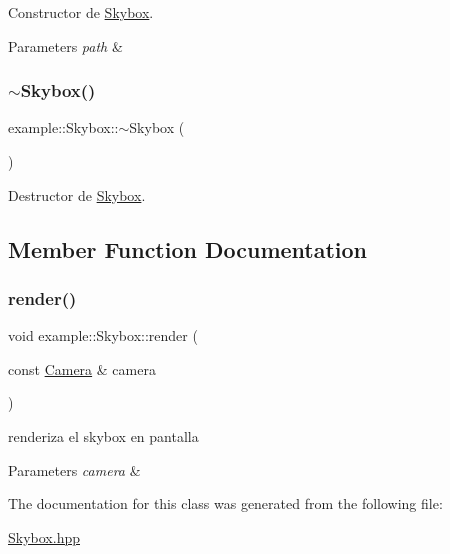 Constructor de \mbox{\hyperlink{classexample_1_1_skybox}{Skybox}}. 


\begin{DoxyParams}{Parameters}
{\em path} & \\
\hline
\end{DoxyParams}
\mbox{\label{classexample_1_1_skybox_abeed66eef405ebc5d29a4bdd949210d8}} 
\subsubsection{\texorpdfstring{$\sim$Skybox()}{~Skybox()}}
{\footnotesize\ttfamily example\+::\+Skybox\+::$\sim$\+Skybox (\begin{DoxyParamCaption}{ }\end{DoxyParamCaption})}



Destructor de \mbox{\hyperlink{classexample_1_1_skybox}{Skybox}}. 



\subsection{Member Function Documentation}
\mbox{\label{classexample_1_1_skybox_a0f6edb0a0b5b81cb31c55b9207a82ad6}} 
\subsubsection{\texorpdfstring{render()}{render()}}
{\footnotesize\ttfamily void example\+::\+Skybox\+::render (\begin{DoxyParamCaption}\item[{const \mbox{\hyperlink{classexample_1_1_camera}{Camera}} \&}]{camera }\end{DoxyParamCaption})}



renderiza el skybox en pantalla 


\begin{DoxyParams}{Parameters}
{\em camera} & \\
\hline
\end{DoxyParams}


The documentation for this class was generated from the following file\+:\begin{DoxyCompactItemize}
\item 
\mbox{\hyperlink{_skybox_8hpp}{Skybox.\+hpp}}\end{DoxyCompactItemize}
